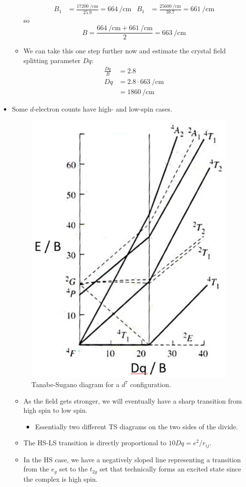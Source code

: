 \documentclass[../notes.tex]{subfiles}
\begin{document}
\begin{itemize}
\begin{itemize}
\begin{align*}
            B_1 &= \frac{\SI{17200}{\per\centi\meter}}{25.9} = \SI{664}{\per\centi\meter}&
            B_1 &= \frac{\SI{25600}{\per\centi\meter}}{38.7} = \SI{661}{\per\centi\meter}
        \end{align*}
        so
        \begin{equation*}
            B = \frac{\SI{664}{\per\centi\meter}+\SI{661}{\per\centi\meter}}{2}
            = \SI{663}{\per\centi\meter}
        \end{equation*}
        \item We can take this one step further now and estimate the crystal field splitting parameter $Dq$:
        \begin{align*}
            \frac{Dq}{B} &= 2.8\\
            Dq &= 2.8\cdot\SI{663}{\per\centi\meter}\\
            &= \SI{1860}{\per\centi\meter}
        \end{align*}
    \end{itemize}
    \item Some $d$-electron counts have high- and low-spin cases.
    \begin{figure}[H]
        \centering
        \includegraphics[width=0.3\linewidth]{../ExtFiles/TSd7.png}
        \caption{Tanabe-Sugano diagram for a $d^7$ configuration.}
        \label{fig:TSd7}
    \end{figure}
    \begin{itemize}
        \item As the field gets stronger, we will eventually have a sharp transition from high spin to low spin.
        \begin{itemize}
            \item Essentially two different TS diagrams on the two sides of the divide.
        \end{itemize}
        \item The HS-LS transition is directly proportional to $10Dq=e^2/r_{ij}$.
        \item In the HS case, we have a negatively sloped line representing a transition from the $e_g$ set to the $t_{2g}$ set that technically forms an excited state since the complex is high spin.

\end{itemize}
\end{itemize}
\end{document}
